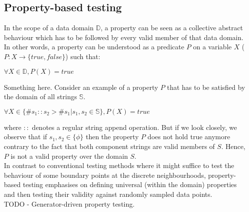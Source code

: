 
\subsection{Property-based testing}
In the scope of a data domain $\mathbb{D}$, a property can be seen as a collective abstract behaviour which has to be followed by every valid member of that data domain. In other words, a property can be understood as a predicate $P$ on a variable $X$ ($P:X \rightarrow \{true, false\}$) such that: 
\begin{center}
$\forall X \in \mathbb{D}, P(X) = true$
\end{center}
Something here.
Consider an example of a property $P$ that has to be satisfied by the domain of all strings $\mathbb{S}$.
\begin{center}
$\forall X \in \{\#s_1::s_2 >  \#s_1| s_1, s_2 \in \mathbb{S}\}, P(X) = true$
\end{center}
where $::$ denotes a regular string append operation. But if we look closely, we observe that if $s_1, s_2 \in \{\phi\}$ then the property $P$ does not hold true anymore contrary to the fact that both component strings are valid members of $S$. Hence, $P$ is not a valid property over the domain $S$. \\
In contrast to conventional testing methods where it might suffice to test the behaviour of some boundary points at the discrete neighbourhoods, property-based testing emphasises on defining universal (within the domain) properties and then testing their validity against randomly sampled data points. \\
TODO - Generator-driven property testing.